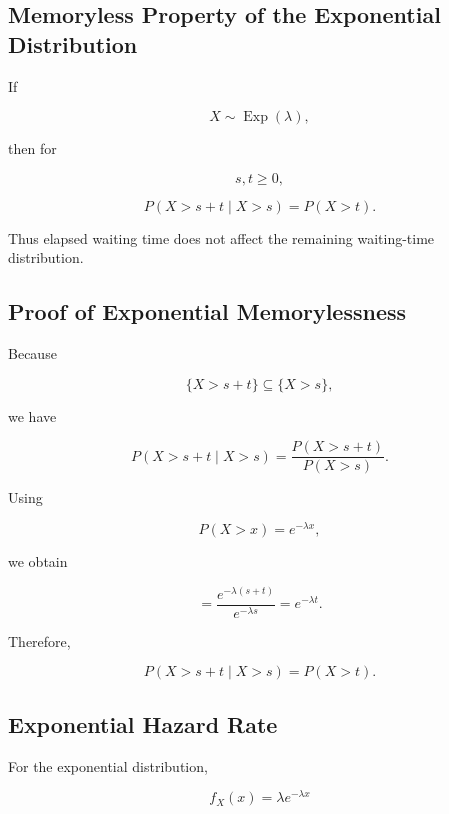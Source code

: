 \subsection{Memoryless Property of the Exponential Distribution}
\label{subsec:exponential-memoryless}

\begin{theorem}
If

\[
X\sim\operatorname{Exp}(\lambda),
\]

then for

\[
s,t\geq0,
\]

\[
\boxed{
P(X>s+t\mid X>s)
=
P(X>t).
}
\]
\end{theorem}

Thus elapsed waiting time does not affect the remaining waiting-time
distribution.

\subsection{Proof of Exponential Memorylessness}
\label{subsec:proof-exponential-memoryless}

Because

\[
\{X>s+t\}
\subseteq
\{X>s\},
\]

we have

\[
P(X>s+t\mid X>s)
=
\frac{P(X>s+t)}{P(X>s)}.
\]

Using

\[
P(X>x)=e^{-\lambda x},
\]

we obtain

\[
=
\frac{
e^{-\lambda(s+t)}
}{
e^{-\lambda s}
}
=
e^{-\lambda t}.
\]

Therefore,

\[
\boxed{
P(X>s+t\mid X>s)
=
P(X>t).
}
\]

\subsection{Exponential Hazard Rate}
\label{subsec:exponential-hazard}

For the exponential distribution,

\[
f_X(x)
=
\lambda e^{-\lambda x}
\]

